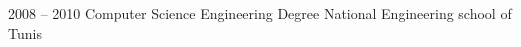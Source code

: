 %
%
%


\begin{scholarship}
	\scholarshipentry
	                {2008 – 2010}
				    {Computer Science Engineering Degree}
				    {National Engineering school of Tunis}
\end{scholarship}